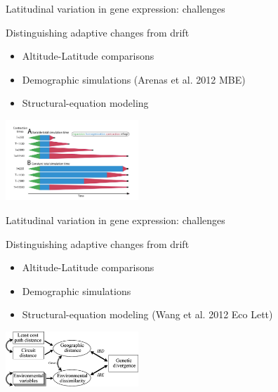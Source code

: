 \documentclass{beamer}
\begin{document}
\begin{frame}{Latitudinal variation in gene expression: challenges}

	\begin{block}{Distinguishing adaptive changes from drift}
		\begin{itemize}
			\item Altitude-Latitude comparisons
			\item<1-| alert@1> Demographic simulations (Arenas et al. 2012 MBE)
			\item Structural-equation modeling
		\end{itemize}
	\end{block}

	\begin{center}
		\includegraphics[width=5cm]{arenas2012-fig2.png}
	\end{center}

\end{frame}


\begin{frame}{Latitudinal variation in gene expression: challenges}

	\begin{block}{Distinguishing adaptive changes from drift}
		\begin{itemize}
			\item Altitude-Latitude comparisons
			\item Demographic simulations
			\item<1-| alert@1> Structural-equation modeling (Wang et al. 2012 Eco Lett)
		\end{itemize}
	\end{block}

	\begin{center}
		\includegraphics[width=5cm]{wang2012-fig2.png}
	\end{center}

\end{frame}
\end{document}
